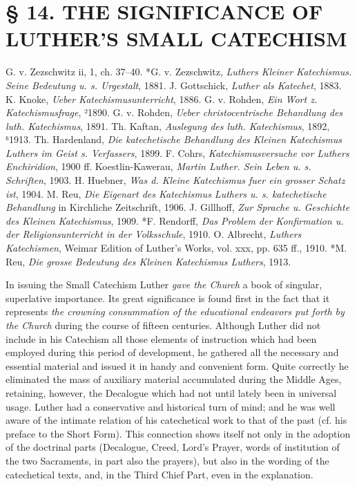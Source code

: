\section[§ 14. LUTHER’S SMALL CATECHISM]{§ 14. THE SIGNIFICANCE OF LUTHER’S SMALL CATECHISM}
G. v. Zezschwitz ii, 1, ch. 37–40. *G. v. Zezschwitz, \emph{Luthers Kleiner Katechismus. Seine Bedeutung u. s. Urgestalt}, 1881. J. Gottschick, \emph{Luther als Katechet}, 1883. K. Knoke, \emph{Ueber Katechismusunterricht}, 1886. G. v. Rohden, \emph{Ein Wort z. Katechismusfrage}, ²1890. G. v. Rohden, \emph{Ueber christocentrische Behandlung des luth. Katechismus}, 1891. Th. Kaftan, \emph{Auslegung des luth. Katechismus}, 1892, ⁶1913. Th. Hardenland, \emph{Die katechetische Behandlung des Kleinen Katechismus Luthers im Geist s. Verfassers}, 1899. F. Cohrs, \emph{Katechismusversuche vor Luthers Enchiridion}, 1900 ff. Koestlin-Kawerau, \emph{Martin Luther. Sein Leben u. s. Schriften}, 1903. H. Huebner, \emph{Was d. Kleine Katechismus fuer ein grosser Schatz ist}, 1904. M. Reu, \emph{Die Eigenart des Katechismus Luthers u. s. katechetische Behandlung} in Kirchliche Zeitschrift, 1906. J. Gillhoff, \emph{Zur Sprache u. Geschichte des Kleinen Katechismus}, 1909. *F. Rendorff, \emph{Das Problem der Konfirmation u. der Religionsunterricht in der Volksschule}, 1910. O. Albrecht, \emph{Luthers Katechismen}, Weimar Edition of Luther’s Works, vol. xxx, pp. 635 ff., 1910. *M. Reu, \emph{Die grosse Bedeutung des Kleinen Katechismus Luthers}, 1913.

In issuing the Small Catechism Luther \emph{gave the Church} a book of singular, superlative importance. Its great significance is found first in the fact that it represents \emph{the crowning consummation of the educational endeavors put forth by the Church} during the course of fifteen centuries. Although Luther did not include in his Catechism all those elements of instruction which had been employed during this period of development, he gathered all the necessary and essential material and issued it in handy and convenient form. Quite correctly he eliminated the mass of auxiliary material accumulated during the Middle Ages, retaining, however, the Decalogue which had not until lately been in universal usage. Luther had a conservative and historical turn of mind; and he was well aware of the intimate relation of his catechetical work to that of the past (cf. his preface to the Short Form). This connection shows itself not only in the
adoption of the doctrinal parts (Decalogue, Creed, Lord’s Prayer, words of institution of the two Sacraments, in part also the prayers), but also in the wording of the catechetical texts, and, in the Third Chief Part, even in the explanation.

